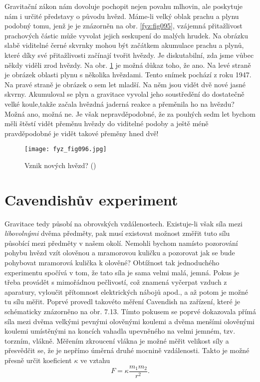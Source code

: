     Gravitační zákon nám dovoluje pochopit nejen povahu mlhovin, ale poskytuje nám i určité 
    představy o původu hvězd. Máme-li velký oblak prachu a plynu podobný tomu, jenž je je znázorněn 
    na obr. \ref{fyz:fig095}, vzájemná přitažlivost prachových částic může vyvolat jejich seskupení 
    do malých hrudek. Na obrázku slabě viditelné  černé skvrnky mohou být začátkem 
    akumulace prachu a plynů, které díky své přitažlivosti začínají tvořit hvězdy. Je diskutabilní, 
    zda jsme vůbec někdy viděli zrod hvězdy. Na obr. \ref{fyz:fig096} je možná důkaz toho, že ano. 
    Na levé straně je obrázek oblasti plynu s několika hvězdami. Tento snímek pochází z roku 
    \num{1947}. Na pravé straně je obrázek o sem let mladší. Na něm jsou vidět dvě nové jasné 
    skvrny. Akumuloval se plyn a gravitace vyvolal jeho soustředění do dostatečně velké koule,takže 
    začala hvězdná jaderná reakce a přeměnila ho na hvězdu? Možná ano, možná ne. Je však 
    nepravděpodobné, že za pouhých sedm let bychom měli štěstí vidět přeměnu hvězdy do viditelné 
    podoby a ještě méně pravděpodobné je vidět takové přeměny hned dvě!

    \begin{figure}[ht!]  %
      \centering
      \texttt{[image: fyz\_fig096.jpg]}
      \caption{Vznik nových hvězd? (\cite[s.~101]{Feynman01})}
      \label{fyz:fig096}
    \end{figure}
    
  \section{Cavendishův experiment}
    Gravitace tedy působí na obrovských vzdálenostech. Existuje-li však síla mezi 
    \emph{libovolnými} dvěma předměty, pak musí existovat možnost změřit tuto sílu působící mezi 
    předměty v našem okolí. Nemohli bychom namísto pozorování pohybu hvězd vzít olověnou a 
    mramorovou kuličku a pozorovat jak se bude pohybovat mramorová kulička k olověné? Obtížnost tak 
    jednoduchého experimentu spočívá v tom, že tato síla je sama velmi malá, jemná. Pokus je třeba 
    provádět s mimořádnou pečlivostí, což znamená vyčerpat vzduch z aparatury, vyloučit přítomnost 
    elektrických nábojů apod., a až potom je možné tu sílu měřit. Poprvé provedl takovéto měření 
    Cavendish na zařízení, které je schématicky znázorněno na obr. 7.13. Tímto pokusem se poprvé 
    dokazovala přímá síla mezi dvěma velkými pevnými olověnými koulemi a dvěma menšími olověnými 
    koulemi umístěnými na koncích vahadla upevněného na velmi jemném, tzv. torzním, vlákně. Měřením 
    zkroucení vlákna je možné měřit velikost síly a přesvědčit se, že je nepřímo úměrná druhé 
    mocnině vzdálenosti. Takto je možné přesně určit koeficient \(\kappa\) ve vztahu
    \begin{equation}\label{fyz:eq094}
      F = \kappa\frac{m_1m_2}{r^2}.
    \end{equation}
    
